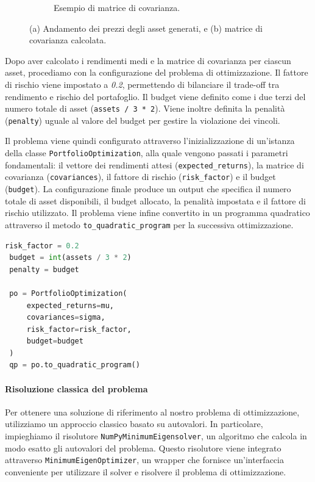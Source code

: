 \begin{figure}[h!]
\begin{subfigure}{0.45\textwidth}
        \caption{Esempio di matrice di covarianza.\footnotemark}
        \label{fig:matriceCovarianza}
    \end{subfigure}
    \caption{(a) Andamento dei prezzi degli asset generati, e (b) matrice di covarianza calcolata.}
\end{figure}


Dopo aver calcolato i rendimenti medi e la matrice di covarianza per ciascun 
asset, procediamo con la configurazione del problema di ottimizzazione. 
Il fattore di rischio viene impostato a \textit{0.2}, permettendo di bilanciare il 
trade-off tra rendimento e rischio del portafoglio. Il budget viene definito come 
i due terzi del numero totale di asset (\texttt{assets / 3 * 2}). Viene inoltre 
definita la penalità (\texttt{penalty}) uguale al valore del budget per gestire la 
violazione dei vincoli.

Il problema viene quindi configurato attraverso l'inizializzazione di 
un'istanza della classe \texttt{PortfolioOptimization}, alla quale vengono 
passati i parametri fondamentali: il vettore dei rendimenti attesi 
(\texttt{expected\_returns}), la matrice di covarianza (\texttt{covariances}), 
il fattore di rischio (\texttt{risk\_factor}) e il budget (\texttt{budget}). 
La configurazione finale produce 
un output che specifica il numero totale di asset disponibili, 
il budget allocato, la penalità impostata e il fattore di rischio 
utilizzato. Il problema viene infine convertito in un programma 
quadratico attraverso il metodo \texttt{to\_quadratic\_program} per la 
successiva ottimizzazione.

\begin{lstlisting}[language=python, caption={Configurazione del problema di PO.}]
 risk_factor = 0.2
 budget = int(assets / 3 * 2)
 penalty = budget

 po = PortfolioOptimization(
     expected_returns=mu, 
     covariances=sigma, 
     risk_factor=risk_factor, 
     budget=budget
 )
 qp = po.to_quadratic_program()
\end{lstlisting}

\paragraph{Risoluzione classica del problema}
Per ottenere una soluzione di riferimento al nostro problema di ottimizzazione, 
utilizziamo un approccio classico basato su autovalori. In particolare, 
impieghiamo il risolutore \texttt{NumPyMinimumEigensolver}, un algoritmo 
che calcola in modo esatto gli autovalori del problema. Questo risolutore 
viene integrato attraverso \texttt{MinimumEigenOptimizer}, un wrapper  
che fornisce un'interfaccia conveniente per utilizzare il solver e
risolvere il problema di ottimizzazione.

